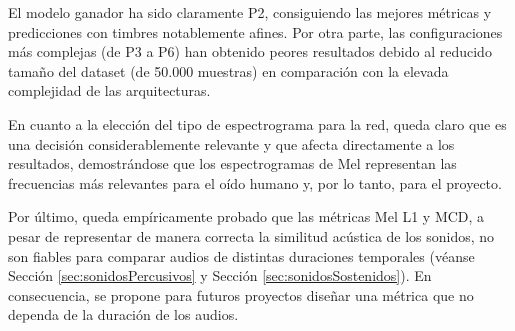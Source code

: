 El modelo ganador ha sido claramente P2, consiguiendo las mejores métricas y predicciones con timbres notablemente afines. Por otra parte, las configuraciones más complejas (de P3 a P6) han obtenido peores resultados debido al reducido tamaño del dataset (de 50.000 muestras) en comparación con la elevada complejidad de las arquitecturas.

En cuanto a la elección del tipo de espectrograma para la red, queda claro que es una decisión considerablemente relevante y que afecta directamente a los resultados, demostrándose que los espectrogramas de Mel representan las frecuencias más relevantes para el oído humano y, por lo tanto, para el proyecto. 

Por último, queda empíricamente probado que las métricas Mel L1 y MCD, a pesar de representar de manera correcta la similitud acústica de los sonidos, no son fiables para comparar audios de distintas duraciones temporales (véanse Sección \ref{sec:sonidosPercusivos} y Sección \ref{sec:sonidosSostenidos}). En consecuencia, se propone para futuros proyectos diseñar una métrica que no dependa de la duración de los audios. 

